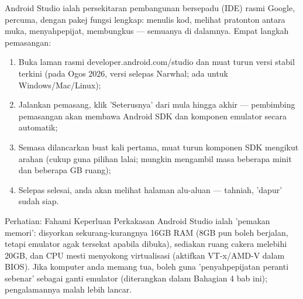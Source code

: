 


Android Studio ialah persekitaran pembangunan bersepadu (IDE) rasmi Google, percuma, dengan pakej fungsi lengkap: menulis kod, melihat pratonton antara muka, menyahpepijat, membungkus — semuanya di dalamnya. Empat langkah pemasangan:

\begin{enumerate}
  \item Buka laman rasmi developer.android.com/studio dan muat turun versi stabil terkini (pada Ogos 2026, versi selepas Narwhal; ada untuk Windows/Mac/Linux);
  \item Jalankan pemasang, klik 'Seterusnya' dari mula hingga akhir — pembimbing pemasangan akan membawa Android SDK dan komponen emulator secara automatik;
  \item Semasa dilancarkan buat kali pertama, muat turun komponen SDK mengikut arahan (cukup guna pilihan lalai; mungkin mengambil masa beberapa minit dan beberapa GB ruang);
  \item Selepas selesai, anda akan melihat halaman alu-aluan — tahniah, 'dapur' sudah siap.
\end{enumerate}

\begin{tcbwarn}{Perhatian: Fahami Keperluan Perkakasan}
Android Studio ialah 'pemakan memori': disyorkan sekurang-kurangnya 16GB RAM (8GB pun boleh berjalan, tetapi emulator agak tersekat apabila dibuka), sediakan ruang cakera melebihi 20GB, dan CPU mesti menyokong virtualisasi (aktifkan VT-x/AMD-V dalam BIOS). Jika komputer anda memang tua, boleh guna 'penyahpepijatan peranti sebenar' sebagai ganti emulator (diterangkan dalam Bahagian 4 bab ini); pengalamannya malah lebih lancar.

\end{tcbwarn}



